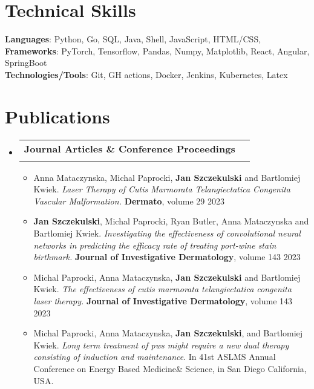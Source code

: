\documentclass[letterpaper,11pt]{article}
\makeatletter
\newcommand{\resumeItem}[1]{
  \item\small{
    {#1 \vspace{-2pt}}
  }
}
\newcommand{\resumeSubheading}[4]{
  \vspace{-2pt}\item
    \begin{tabular*}{1.0\textwidth}[t]{l@{\extracolsep{\fill}}r}
      \textbf{#1} & \textbf{\small #2} \\
      \textit{\small#3} & \textit{\small #4} \\
    \end{tabular*}\vspace{-7pt}
}
\newcommand{\resumeSubHeadingListStart}{\begin{itemize}[leftmargin=0.0in, label={}]}
\newcommand{\resumeSubHeadingListEnd}{\end{itemize}}
\newcommand{\resumeItemListStart}{\begin{itemize}}
\newcommand{\resumeItemListEnd}{\end{itemize}\vspace{-5pt}}
\makeatother
\begin{document}
\section{Technical Skills}
 \begin{itemize}[leftmargin=0.15in, label={}]
    \small{\item{
     \textbf{Languages}{: Python, Go, SQL, Java, Shell, JavaScript, HTML/CSS,} \\
     \textbf{Frameworks}{: PyTorch, Tensorflow, Pandas, Numpy, Matplotlib, React, Angular, SpringBoot} \\
     \textbf{Technologies/Tools}{: Git, GH actions, Docker, Jenkins, Kubernetes, Latex} \\
    }}
 \end{itemize}
 \vspace{-16pt}


\section{Publications}
    \resumeSubHeadingListStart
        \resumeSubheading{Journal Articles \& Conference Proceedings}{}{}{}
            \resumeItemListStart
                \resumeItem{Anna Mataczynska, Michal Paprocki, \textbf{Jan Szczekulski} and Bartlomiej Kwiek. \textit{Laser Therapy of Cutis Marmorata Telangiectatica Congenita Vascular Malformation.} \textbf{Dermato}, volume 29 2023}
                \vspace{3pt}
                \resumeItem{\textbf{Jan Szczekulski}, Michal Paprocki, Ryan Butler, Anna Mataczynska and Bartlomiej Kwiek. \textit{Investigating the effectiveness of convolutional neural networks in predicting the efficacy rate of treating port-wine stain birthmark.} \textbf{Journal of Investigative Dermatology}, volume 143 2023}
                \vspace{3pt}
                \resumeItem{Michal Paprocki, Anna Mataczynska, \textbf{Jan Szczekulski} and Bartlomiej Kwiek. \textit{The effectiveness of cutis marmorata telangiectatica congenita laser therapy.} \textbf{Journal of Investigative Dermatology}, volume 143 2023}
                \vspace{3pt}
                \resumeItem{Michal Paprocki, Anna Mataczynska, \textbf{Jan Szczekulski}, and Bartlomiej Kwiek. \textit{Long term treatment of pws might require a new dual therapy consisting of induction and maintenance}. In 41st ASLMS Annual Conference on Energy Based Medicine\& Science, in San Diego California, USA.}
            \resumeItemListEnd
    \resumeSubHeadingListEnd
\end{document}

